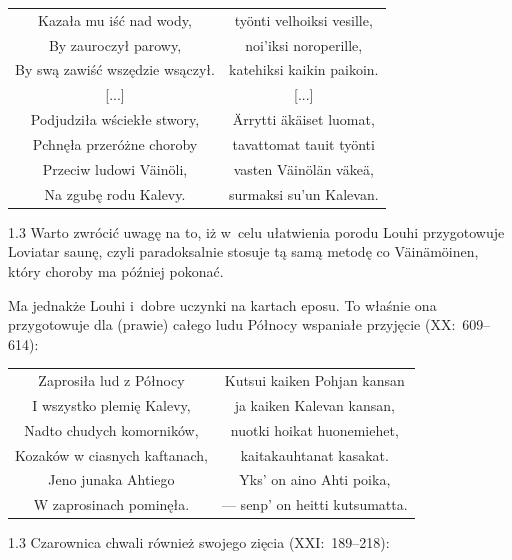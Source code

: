 \documentclass[11pt,a4paper,twoside]{report}
\begin{document}
{\begin{longtable}{c c}
Kazała mu iść nad wody, & työnti velhoiksi vesille, \\ \newpage
By zauroczył parowy, & noi'iksi noroperille, \\
By swą zawiść wszędzie wsączył. & katehiksi kaikin paikoin. \\
{[...]} & {[...]} \\
Podjudziła wściekłe stwory, & Ärrytti äkäiset luomat, \\
Pchnęła przeróżne choroby & tavattomat tauit työnti \\
Przeciw ludowi Väinöli, & vasten Väinölän väkeä, \\
Na zgubę rodu Kalevy. & surmaksi su'un Kalevan. \\
\end{longtable}
}
\begin{spacing}{1.3}
Warto zwrócić uwagę na to, iż w~celu ułatwienia porodu Louhi przygotowuje Loviatar saunę, czyli paradoksalnie stosuje tą samą metodę co Väinämöinen, który choroby ma później pokonać.

Ma jednakże Louhi i~dobre uczynki na kartach eposu. To właśnie ona przygotowuje dla (prawie) całego ludu Północy wspaniałe przyjęcie (XX:~609--614):
\end{spacing}
{\centering
\small
\begin{longtable}{c c}
Zaprosiła lud z Północy & Kutsui kaiken Pohjan kansan \\
I wszystko plemię Kalevy, & ja kaiken Kalevan kansan, \\
Nadto chudych komorników, & nuotki hoikat huonemiehet, \\
Kozaków w ciasnych kaftanach, & kaitakauhtanat kasakat. \\
Jeno junaka Ahtiego & Yks' on aino Ahti poika, \\
W zaprosinach pominęła. & --- senp' on heitti kutsumatta. \\
\end{longtable}
}
\begin{spacing}{1.3}
Czarownica chwali również swojego zięcia (XXI:~189--218):
\end{spacing}
\end{document}
